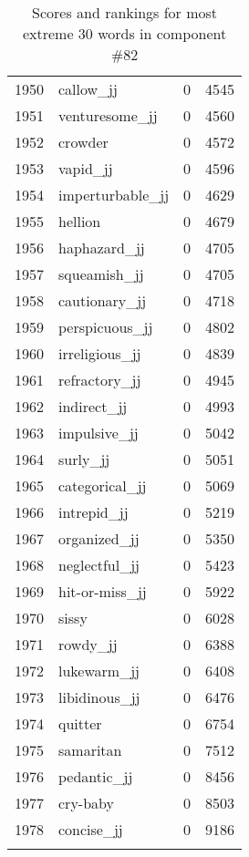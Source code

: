 \begin{longtable}[!htbp]{| rlr@{.}l |}
    1950 & callow\_jj & 0 & 4545 \\
    1951 & venturesome\_jj & 0 & 4560 \\
    1952 & crowder & 0 & 4572 \\
    1953 & vapid\_jj & 0 & 4596 \\
    1954 & imperturbable\_jj & 0 & 4629 \\
    1955 & hellion & 0 & 4679 \\
    1956 & haphazard\_jj & 0 & 4705 \\
    1957 & squeamish\_jj & 0 & 4705 \\
    1958 & cautionary\_jj & 0 & 4718 \\
    1959 & perspicuous\_jj & 0 & 4802 \\
    1960 & irreligious\_jj & 0 & 4839 \\
    1961 & refractory\_jj & 0 & 4945 \\
    1962 & indirect\_jj & 0 & 4993 \\
    1963 & impulsive\_jj & 0 & 5042 \\
    1964 & surly\_jj & 0 & 5051 \\
    1965 & categorical\_jj & 0 & 5069 \\
    1966 & intrepid\_jj & 0 & 5219 \\
    1967 & organized\_jj & 0 & 5350 \\
    1968 & neglectful\_jj & 0 & 5423 \\
    1969 & hit-or-miss\_jj & 0 & 5922 \\
    1970 & sissy & 0 & 6028 \\
    1971 & rowdy\_jj & 0 & 6388 \\
    1972 & lukewarm\_jj & 0 & 6408 \\
    1973 & libidinous\_jj & 0 & 6476 \\
    1974 & quitter & 0 & 6754 \\
    1975 & samaritan & 0 & 7512 \\
    1976 & pedantic\_jj & 0 & 8456 \\
    1977 & cry-baby & 0 & 8503 \\
    1978 & concise\_jj & 0 & 9186 \\
    \hline
    \caption{Scores and rankings for most extreme 30 words in component \#82} \\
\end{longtable}
